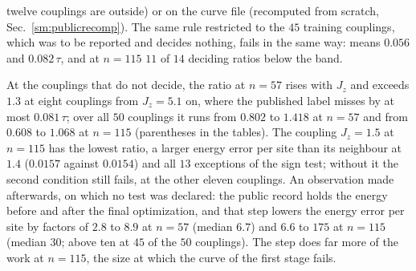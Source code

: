 \documentclass[aps,prx,onecolumn,10pt,nofootinbib,longbibliography,floatfix]{revtex4-2}
\theoremstyle{remark}
\newcommand{\Jz}{J_z}
\begin{document}
twelve couplings are outside) or on the curve file (recomputed from scratch, Sec.~\ref{sm:publicrecomp}). The same
rule restricted to the $45$ training couplings, which was to be reported and decides nothing, fails in the same way: %
means $0.056$ and $0.082\,\tau$, and at $n=115$ $11$ of $14$ deciding ratios below the band. %

At the couplings that do not decide, the ratio at $n=57$ rises with $\Jz$ and exceeds $1.3$ at eight couplings from %
$\Jz=5.1$ on, where the published label misses by at most $0.081\,\tau$; over all $50$ couplings it runs from %
$0.802$ to $1.418$ at $n=57$ and from $0.608$ to $1.068$ at $n=115$ (parentheses in the tables). The coupling %
$\Jz=1.5$ at $n=115$ has the lowest ratio, a larger energy error per site than its neighbour at $1.4$ ($0.0157$ %
against $0.0154$) and all $13$ exceptions of the sign test; without it the second condition still fails, at the %
other eleven couplings. An observation made afterwards, on which no test was declared: the public record holds the
energy before and after the final optimization, and that step lowers the energy error per site by factors of $2.8$ %
to $8.9$ at $n=57$ (median $6.7$) and $6.6$ to $175$ at $n=115$ (median $30$; above ten at $45$ of the $50$ %
couplings). The step does far more of the work at $n=115$, the size at which the curve of the first stage fails.
\end{document}
